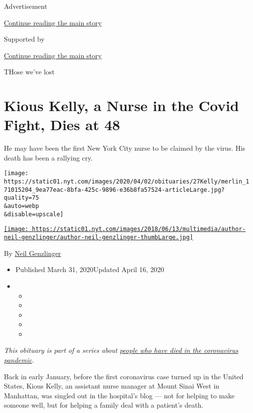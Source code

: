 Advertisement

\protect\hyperlink{after-top}{Continue reading the main story}

Supported by

\protect\hyperlink{after-sponsor}{Continue reading the main story}

THose we've lost

\hypertarget{kious-kelly-a-nurse-in-the-covid-fight-dies-at-48}{%
\section{Kious Kelly, a Nurse in the Covid Fight, Dies at
48}\label{kious-kelly-a-nurse-in-the-covid-fight-dies-at-48}}

He may have been the first New York City nurse to be claimed by the
virus. His death has been a rallying cry.

\texttt{[image: https://static01.nyt.com/images/2020/04/02/obituaries/27Kelly/merlin\_171015204\_9ea77eac-8bfa-425c-9896-e36b8fa57524-articleLarge.jpg?quality=75\\\&auto=webp\\\&disable=upscale]}

\href{https://www.nytimes.com/by/neil-genzlinger}{\texttt{[image: https://static01.nyt.com/images/2018/06/13/multimedia/author-neil-genzlinger/author-neil-genzlinger-thumbLarge.jpg]}}

By \href{https://www.nytimes.com/by/neil-genzlinger}{Neil Genzlinger}

\begin{itemize}
\item
  Published March 31, 2020Updated April 16, 2020
\item
  \begin{itemize}
  \item
  \item
  \item
  \item
  \item
  \end{itemize}
\end{itemize}

\emph{This obituary is part of a series about}
\href{https://www.nytimes.com/series/people-who-have-died-of-the-coronavirus}{\emph{people
who have died in the coronavirus pandemic}}\emph{.}

Back in early January, before the first coronavirus case turned up in
the United States, Kious Kelly, an assistant nurse manager at Mount
Sinai West in Manhattan, was singled out in the hospital's blog --- not
for helping to make someone well, but for helping a family deal with a
patient's death.

